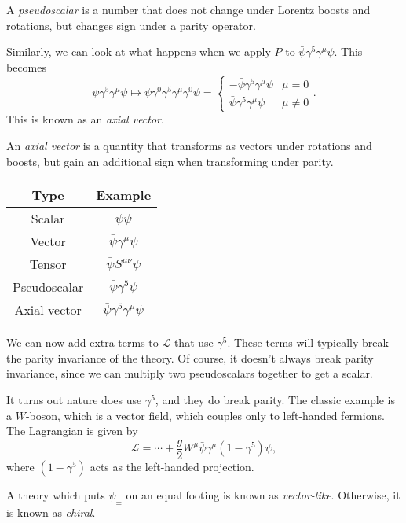 \documentclass[a4paper]{article}
\begin{document}
\begin{defi}[Pseudoscalar]
  A \emph{pseudoscalar} is a number that does not change under Lorentz boosts and rotations, but changes sign under a parity operator.
\end{defi}
Similarly, we can look at what happens when we apply $P$ to $\bar \psi \gamma^5 \gamma^\mu \psi$. This becomes
\[
  \bar \psi \gamma^5 \gamma^\mu \psi \mapsto \bar\psi \gamma^0 \gamma^5 \gamma^\mu \gamma^0 \psi =
  \begin{cases}
    - \bar\psi \gamma^5 \gamma^\mu \psi & \mu = 0\\
    \bar\psi \gamma^5 \gamma^\mu \psi & \mu \not= 0
  \end{cases}.
\]
This is known as an \emph{axial vector}.
\begin{defi}
  An \emph{axial vector} is a quantity that transforms as vectors under rotations and boosts, but gain an additional sign when transforming under parity.
\end{defi}
\begin{center}
  \begin{tabular}{cc}
    \toprule
    Type & Example\\
    \midrule
    Scalar & $\bar\psi \psi$\\
    Vector & $\bar \psi \gamma^\mu \psi$\\
    Tensor & $\bar \psi S^{\mu\nu} \psi$\\
    Pseudoscalar & $\bar \psi \gamma^5 \psi$\\
    Axial vector & $\bar\psi \gamma^5 \gamma^\mu \psi$\\
    \bottomrule
  \end{tabular}
\end{center}
We can now add extra terms to $\mathcal{L}$ that use $\gamma^5$. These terms will typically break the parity invariance of the theory. Of course, it doesn't always break parity invariance, since we can multiply two pseudoscalars together to get a scalar.

It turns out nature does use $\gamma^5$, and they do break parity. The classic example is a $W$-boson, which is a vector field, which couples only to left-handed fermions. The Lagrangian is given by
\[
  \mathcal{L} = \cdots + \frac{g}{2} W^\mu \bar\psi \gamma^\mu(1 - \gamma^5) \psi,
\]
where $(1 - \gamma^5)$ acts as the left-handed projection.

A theory which puts $\psi_{\pm}$ on an equal footing is known as \emph{vector-like}. Otherwise, it is known as \emph{chiral}.
\end{document}
